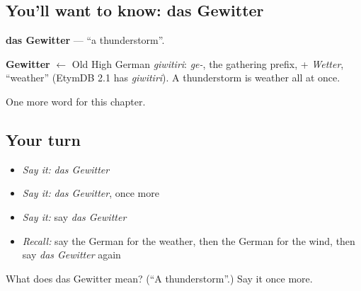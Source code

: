 \subsection*{You'll want to know: das Gewitter}
\textbf{das Gewitter} — \textquotedblleft{}a thunderstorm\textquotedblright{}.

\begin{cousinweb}
\textbf{Gewitter} $\leftarrow$ Old High German \emph{giwitiri}: \emph{ge-}, the gathering prefix, + \emph{Wetter}, \textquotedblleft{}weather\textquotedblright{} (EtymDB 2.1 has \emph{giwitiri}). A thunderstorm is weather all at once.
\end{cousinweb}

\begin{grammarlens}[title={What you've built}]
One more word for this chapter.
\end{grammarlens}

\subsection*{Your turn}
\begin{itemize}
\raggedright
  \item \emph{Say it:} \emph{das Gewitter}
  \item \emph{Say it:} \emph{das Gewitter}, once more
  \item \emph{Say it:} say \emph{das Gewitter}
  \item \emph{Recall:} say the German for the weather, then the German for the wind, then say \emph{das Gewitter} again
\end{itemize}

\begin{tcolorbox}[breakable,colback=teal!4,colframe=teal!35!black,title={Before you move on}]
What does das Gewitter mean? (\textquotedblleft{}A thunderstorm\textquotedblright{}.) Say it once more.
\end{tcolorbox}
